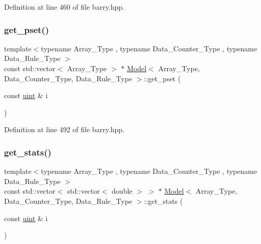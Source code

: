 Definition at line 460 of file barry.\+hpp.

\mbox{\label{classbarry_1_1_model_ad09221a8938765deec2c9d4d0fa8dec5}} 
\subsubsection{\texorpdfstring{get\+\_\+pset()}{get\_pset()}}
{\footnotesize\ttfamily template$<$typename Array\+\_\+\+Type , typename Data\+\_\+\+Counter\+\_\+\+Type , typename Data\+\_\+\+Rule\+\_\+\+Type $>$ \\
const std\+::vector$<$ Array\+\_\+\+Type $>$ $\ast$ \hyperlink{classbarry_1_1_model}{Model}$<$ Array\+\_\+\+Type, Data\+\_\+\+Counter\+\_\+\+Type, Data\+\_\+\+Rule\+\_\+\+Type $>$\+::get\+\_\+pset (\begin{DoxyParamCaption}\item[{const \hyperlink{namespacebarry_a11dfc53ddb4672278319aa04f1e09a6c}{uint} \&}]{i }\end{DoxyParamCaption})\hspace{0.3cm}{\ttfamily [inline]}}



Definition at line 492 of file barry.\+hpp.

\mbox{\label{classbarry_1_1_model_adde1cf74eb0ca7f771b7878af9766cdf}} 
\subsubsection{\texorpdfstring{get\+\_\+stats()}{get\_stats()}}
{\footnotesize\ttfamily template$<$typename Array\+\_\+\+Type , typename Data\+\_\+\+Counter\+\_\+\+Type , typename Data\+\_\+\+Rule\+\_\+\+Type $>$ \\
const std\+::vector$<$ std\+::vector$<$ double $>$ $>$ $\ast$ \hyperlink{classbarry_1_1_model}{Model}$<$ Array\+\_\+\+Type, Data\+\_\+\+Counter\+\_\+\+Type, Data\+\_\+\+Rule\+\_\+\+Type $>$\+::get\+\_\+stats (\begin{DoxyParamCaption}\item[{const \hyperlink{namespacebarry_a11dfc53ddb4672278319aa04f1e09a6c}{uint} \&}]{i }\end{DoxyParamCaption})\hspace{0.3cm}{\ttfamily [inline]}}




